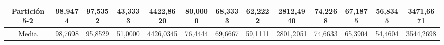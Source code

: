 \documentclass[12pt]{article}
\begin{document}
\begin{table}[H]
{\begin{tabular}{|c|cccc|cccc|cccc|}
Partición 5-2 & \multicolumn{1}{c|}{98,9474}                                                  & \multicolumn{1}{c|}{97,5352}                                                 & \multicolumn{1}{c|}{43,3333} & 4422,8620 & \multicolumn{1}{c|}{80,0000}                                                  & \multicolumn{1}{c|}{68,3333}                                                 & \multicolumn{1}{c|}{62,2222} & 2812,4940 & \multicolumn{1}{c|}{74,2268}                                                  & \multicolumn{1}{c|}{67,1875}                                                 & \multicolumn{1}{c|}{56,8345} & 3471,6671 \\ \hline
Media         & \multicolumn{1}{c|}{98,7698}                                                  & \multicolumn{1}{c|}{95,8529}                                                 & \multicolumn{1}{c|}{51,0000} & 4426,0345 & \multicolumn{1}{c|}{76,4444}                                                  & \multicolumn{1}{c|}{69,6667}                                                 & \multicolumn{1}{c|}{59,1111} & 2801,2051 & \multicolumn{1}{c|}{74,6633}                                                  & \multicolumn{1}{c|}{65,3904}                                                 & \multicolumn{1}{c|}{54,4604} & 3544,2698 \\ \hline
\end{tabular}}
\end{table}
\end{document}
